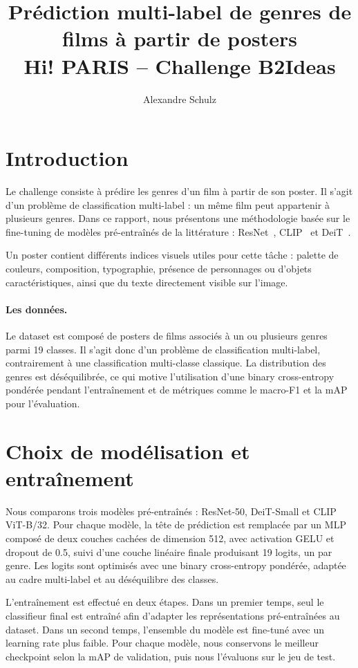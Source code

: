\documentclass[10pt,a4paper]{article}
\title{\vspace{-1.2cm}Prédiction multi-label de genres de films à partir de posters\\[0.05em]
\small Hi! PARIS -- Challenge B2Ideas}
\author{Alexandre Schulz}
\begin{document}
\maketitle

\section{Introduction}
Le challenge consiste à prédire les genres d'un film à partir de son poster. Il s'agit d'un problème de classification multi-label : un même film peut appartenir à plusieurs genres. Dans ce rapport, nous présentons une méthodologie basée sur le fine-tuning de modèles pré-entraînés de la littérature : ResNet~\cite{he2016}, CLIP~\cite{radford2021} et DeiT~\cite{touvron2021}. 

Un poster contient différents indices visuels utiles pour cette tâche : palette de couleurs, composition, typographie, présence de personnages ou d'objets caractéristiques, ainsi que du texte directement visible sur l'image.

\paragraph{Les données.}
Le dataset est composé de posters de films associés à un ou plusieurs genres parmi 19 classes.
Il s'agit donc d'un problème de classification multi-label, contrairement à une classification multi-classe classique.
La distribution des genres est déséquilibrée, ce qui motive l'utilisation d'une binary cross-entropy pondérée pendant l'entraînement et de métriques comme le macro-F1 et la mAP pour l'évaluation.

\section{Choix de modélisation et entraînement} 
Nous comparons trois modèles pré-entraînés : ResNet-50, DeiT-Small et CLIP ViT-B/32.
Pour chaque modèle, la tête de prédiction est remplacée par un MLP composé de deux couches cachées de dimension 512, avec activation GELU et dropout de 0.5, suivi d'une couche linéaire finale produisant 19 logits, un par genre.
Les logits sont optimisés avec une binary cross-entropy pondérée, adaptée au cadre multi-label et au déséquilibre des classes.

L'entraînement est effectué en deux étapes.
Dans un premier temps, seul le classifieur final est entraîné afin d'adapter les représentations pré-entraînées au dataset.
Dans un second temps, l'ensemble du modèle est fine-tuné avec un learning rate plus faible.
Pour chaque modèle, nous conservons le meilleur checkpoint selon la mAP de validation, puis nous l'évaluons sur le jeu de test.
\end{document}
